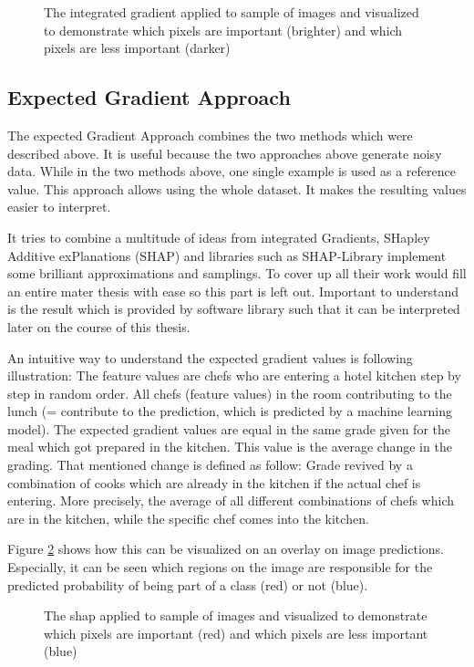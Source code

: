\begin{figure}[htp]
	\centering
	\caption{The integrated gradient applied to sample of images and visualized to demonstrate which pixels are important (brighter) and which pixels are less important (darker)}
	\label{fig:igiu}
\end{figure}

\subsection{Expected Gradient Approach}
\label{subsec:expected_gradient_approach}
The expected Gradient Approach combines the two methods which were described above. It is useful because the two approaches above generate noisy data. While in the two methods above, one single example is used as a reference value. This approach allows using the whole dataset. It makes the resulting values easier to interpret. 

It tries to combine a multitude of ideas from integrated Gradients, SHapley Additive exPlanations (SHAP) and libraries such as SHAP-Library implement some brilliant approximations and samplings. To cover up all their work would fill an entire mater thesis with ease so this part is left out. Important to understand is the result which is provided by software library such that it can be interpreted later on the course of this thesis.

An intuitive way to understand the expected gradient values is following illustration: The feature values are chefs who are entering a hotel kitchen step by step in random order. All chefs (feature values) in the room contributing to the lunch (= contribute to the prediction, which is predicted by a machine learning model). The expected gradient values are equal in the same grade given for the meal which got prepared in the kitchen. This value is the average change in the grading. That mentioned change is defined as follow: Grade revived by a combination of cooks which are already in the kitchen if the actual chef is entering. More precisely, the average of all different combinations of chefs which are in the kitchen, while the specific chef comes into the kitchen. 

Figure \ref{fig:gradient_imagenet_plot} shows how this can be visualized on an overlay on image predictions. Especially, it can be seen which regions on the image are responsible for the predicted probability of being part of a class (red) or not (blue). 

\begin{figure}[htp]
	\centering
	\caption{The shap applied to sample of images and visualized to demonstrate which pixels are important (red) and which pixels are less important (blue) \cite{shaoshan91:online}}
	\label{fig:gradient_imagenet_plot}
\end{figure}
